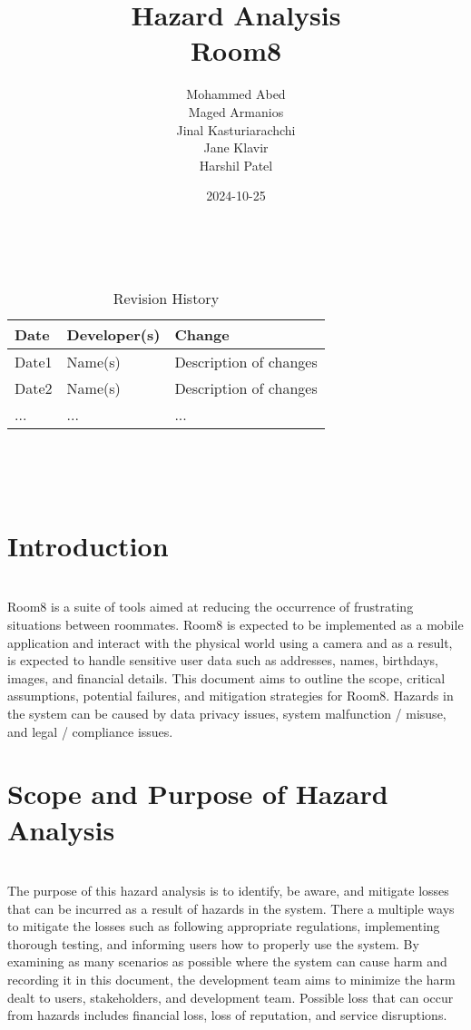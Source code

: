 \documentclass{article}
\title{Hazard Analysis\\Room8}
\author{Mohammed Abed \\ 
        Maged Armanios\\
        Jinal Kasturiarachchi\\
        Jane Klavir\\
        Harshil Patel\\}
\date{2024-10-25}
\begin{document}
\maketitle
\thispagestyle{empty}

~\newpage


\begin{table}[hp]
\caption{Revision History} \label{TblRevisionHistory}
\begin{tabularx}{\textwidth}{llX}
\toprule
\textbf{Date} & \textbf{Developer(s)} & \textbf{Change}\\
\midrule
Date1 & Name(s) & Description of changes\\
Date2 & Name(s) & Description of changes\\
... & ... & ...\\
\bottomrule
\end{tabularx}
\end{table}

~\newpage

\tableofcontents

~\newpage



\section{Introduction}

\\
Room8 is a suite of tools aimed at reducing the occurrence of frustrating situations between roommates. Room8 is expected to be implemented as a mobile application and interact with the physical world using a camera and as a result, is expected to handle sensitive user data such as addresses, names, birthdays, images, and financial details. This document aims to outline the scope, critical assumptions, potential failures, and mitigation strategies for Room8. Hazards in the system can be caused by data privacy issues, system malfunction / misuse, and legal / compliance issues.


\section{Scope and Purpose of Hazard Analysis}

\\
The purpose of this hazard analysis is to identify, be aware, and mitigate losses that can be incurred as a result of hazards in the system. There a multiple ways to mitigate the losses such as following appropriate regulations, implementing thorough testing, and informing users how to properly use the system. By examining as many scenarios as possible where the system can cause harm and recording it in this document, the development team aims to minimize the harm dealt to users, stakeholders, and development team. Possible loss that can occur from hazards includes financial loss, loss of reputation, and service disruptions.   
\end{document}
